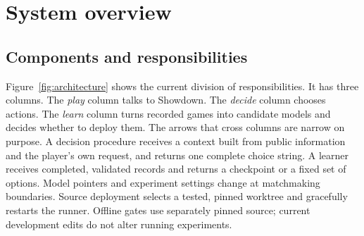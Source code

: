 \section{System overview}
\label{sec:system}

\subsection{Components and responsibilities}
Figure~\ref{fig:architecture} shows the current division of responsibilities. It has three
columns. The \emph{play} column talks to Showdown. The \emph{decide} column
chooses actions. The \emph{learn} column turns recorded games into candidate
models and decides whether to deploy them. The arrows that cross columns are
narrow on purpose. A decision procedure receives a context built from public
information and the player's own request, and returns one complete choice
string. A learner receives completed, validated records and returns a
checkpoint or a fixed set of options. Model pointers and experiment settings
change at matchmaking boundaries. Source deployment selects a tested, pinned
worktree and gracefully restarts the runner. Offline gates use separately
pinned source; current development edits do not alter running experiments.

